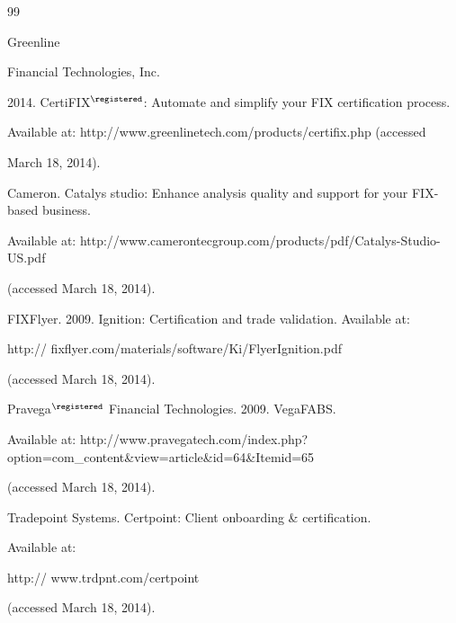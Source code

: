 {{\begin{thebibliography}{99}


{Greenline


Financial Technologies, Inc.} 2014. CertiFIX$^\registered$: Automate and simplify your FIX certification process.


Available at: {\sf http://www.greenlinetech.com/\linebreak products/certifix.php} (accessed


March 18, 2014).







 Cameron. Catalys studio: Enhance analysis quality and support for your FIX-based business.


Available at: {\sf http://www.camerontecgroup.com/products/pdf/Catalys-Studio-US.pdf}


(accessed March 18, 2014).







FIXFlyer. 2009. Ignition: Certification and trade validation.  Available at: {\sf


http:// fixflyer.com/materials/software/Ki/FlyerIgnition.pdf} (accessed March 18, 2014).





\pagebreak







Pravega$^\registered$ Financial Technologies. 2009. VegaFABS.


Available at: {\sf http://www.\linebreak pravegatech.com/index.php?option=com\_content\&view=article\&id=64\&Itemid=65}


(accessed March 18, 2014).







Tradepoint Systems. Certpoint: Client onboarding \& certification.


Available at: {\sf


http:// www.trdpnt.com/certpoint} (accessed March 18, 2014).










\end{thebibliography}}}
